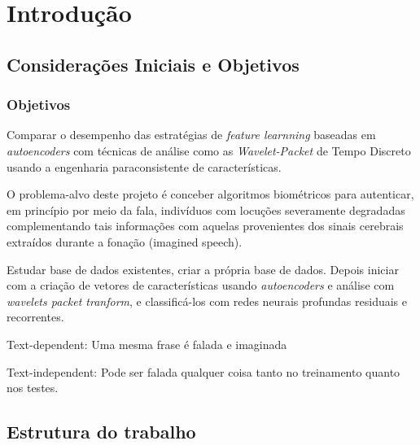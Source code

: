 \chapter{Introdução}
	\section{Considerações Iniciais e Objetivos}
		\subsection{Objetivos}
			\par Comparar o desempenho das estratégias de \textit{feature learnning} baseadas em \textit{autoencoders} com técnicas de análise como as \textit{Wavelet-Packet} de Tempo Discreto usando a engenharia paraconsistente de características.
			\par O problema-alvo deste projeto é conceber algoritmos biométricos para autenticar, em princípio por meio da fala,  indivíduos com locuções severamente degradadas complementando tais informações com aquelas provenientes dos sinais cerebrais extraídos durante a fonação (imagined speech).
			\par Estudar base de dados existentes, criar a própria base de dados. Depois iniciar com a criação de vetores de características usando \textit{autoencoders} e análise com \textit{wavelets packet tranform}, e classificá-los com redes neurais profundas residuais e recorrentes.
			\par Text-dependent: Uma mesma frase é falada e imaginada
			\par Text-independent: Pode ser falada qualquer coisa tanto no treinamento quanto nos testes.
	\section{Estrutura do trabalho}
